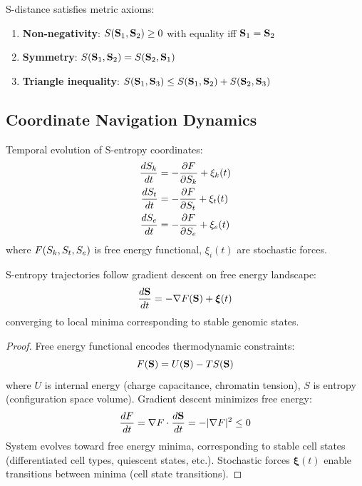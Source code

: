 \begin{proposition}
\label{prop:s_distance_properties}
S-distance satisfies metric axioms:
\begin{enumerate}
\item \textbf{Non-negativity}: $S(\mathbf{S}_1, \mathbf{S}_2) \geq 0$ with equality iff $\mathbf{S}_1 = \mathbf{S}_2$
\item \textbf{Symmetry}: $S(\mathbf{S}_1, \mathbf{S}_2) = S(\mathbf{S}_2, \mathbf{S}_1)$
\item \textbf{Triangle inequality}: $S(\mathbf{S}_1, \mathbf{S}_3) \leq S(\mathbf{S}_1, \mathbf{S}_2) + S(\mathbf{S}_2, \mathbf{S}_3)$
\end{enumerate}
\end{proposition}

\subsection{Coordinate Navigation Dynamics}

\begin{definition}
\label{def:s_entropy_flow}
Temporal evolution of S-entropy coordinates:
\begin{align}
\frac{dS_k}{dt} &= -\frac{\partial F}{\partial S_k} + \xi_k(t) \\
\frac{dS_t}{dt} &= -\frac{\partial F}{\partial S_t} + \xi_t(t) \\
\frac{dS_e}{dt} &= -\frac{\partial F}{\partial S_e} + \xi_e(t)
\end{align}
where $F(S_k, S_t, S_e)$ is free energy functional, $\xi_i(t)$ are stochastic forces.
\end{definition}

\begin{theorem}
\label{thm:free_energy_min}
S-entropy trajectories follow gradient descent on free energy landscape:
\begin{equation}
\frac{d\mathbf{S}}{dt} = -\nabla F(\mathbf{S}) + \boldsymbol{\xi}(t)
\end{equation}
converging to local minima corresponding to stable genomic states.
\end{theorem}

\begin{proof}
Free energy functional encodes thermodynamic constraints:
\begin{equation}
F(\mathbf{S}) = U(\mathbf{S}) - TS(\mathbf{S})
\end{equation}
where $U$ is internal energy (charge capacitance, chromatin tension), $S$ is entropy (configuration space volume). Gradient descent minimizes free energy:
\begin{equation}
\frac{dF}{dt} = \nabla F \cdot \frac{d\mathbf{S}}{dt} = -|\nabla F|^2 \leq 0
\end{equation}
System evolves toward free energy minima, corresponding to stable cell states (differentiated cell types, quiescent states, etc.). Stochastic forces $\boldsymbol{\xi}(t)$ enable transitions between minima (cell state transitions).
\end{proof}

